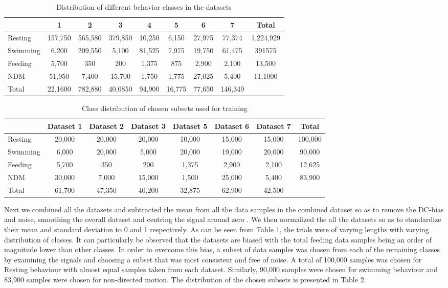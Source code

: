 \documentclass[conference]{IEEEtran}
\begin{document}
\begin{table}[tp!]
	\centering
	\caption{Distribution of different behavior classes in the datasets}
	\begin{tabular}{l c c c c c c c c}
	\hline
	& 1 & 2 & 3 & 4 & 5 & 6 & 7 & Total \\
	\hline
	Resting & 157,750 & 565,580 & 379,850 & 10,250 & 6,150 & 27,975 & 77,374 & 1,224,929 \\
	Swimming & 6,200 & 209,550 & 5,100 & 81,525 & 7,975 & 19,750 & 61,475 & 391575 \\
	Feeding & 5,700 & 350 & 200 & 1,375 & 875 & 2,900 & 2,100 & 13,500 \\
	NDM & 51,950 & 7,400 & 15,700 & 1,750 & 1,775 & 27,025 & 5,400 & 11,1000 \\
	Total & 22,1600 & 782,880 & 40,0850 & 94,900 & 16,775 & 77,650 & 146,349 &  \\
	\hline
	\end{tabular}
	\label{}
\end{table}

\begin{table}[tp!]
	\centering
	\caption{Class distribution of chosen subsets used for training}
	\begin{tabular}{l c c c c c c c}
	\hline
	& Dataset 1 & Dataset 2 & Dataset 3 & Dataset 5 & Dataset 6 & Dataset 7 & Total \\
	\hline
	Resting & 20,000 & 20,000 & 20,000 & 10,000 & 15,000 & 15,000 & 100,000 \\
	Swimming & 6,000 & 20,000 & 5,000 & 20,000 & 19,000 & 20,000 & 90,000 \\
	Feeding & 5,700 & 350 & 200 & 1,375 & 2,900 & 2,100 & 12,625 \\
	NDM & 30,000 & 7,000 & 15,000 & 1,500 & 25,000 & 5,400 & 83,900 \\
	Total & 61,700 & 47,350 & 40,200 & 32,875 & 62,900 & 42,500 \\
	\hline
	\end{tabular}
	\label{}
\end{table}




Next we combined all the datasets and subtracted the mean from all the data samples in the combined dataset so as to remove the DC-bias and noise, smoothing the overall dataset and centring the signal around zero \cite{14}. We then normalized the all the datasets so as to standardize their mean and standard deviation to 0 and 1 respectively. 
As can be seen from Table 1, the trials were of varying lengths with varying distribution of classes. It can particularly be observed that the datasets are biased with the total feeding data samples being an order of magnitude lower than other classes. In order to overcome this bias, a subset of data samples was chosen from each of the remaining classes by examining the signals and choosing a subset that was most consistent and free of noise. A total of 100,000 samples was chosen for Resting behaviour with almost equal samples taken from each dataset. Similarly, 90,000 samples were chosen for swimming behaviour and 83,900 samples were chosen for non-directed motion. The distribution of the chosen subsets is presented in Table 2.
\end{document}
